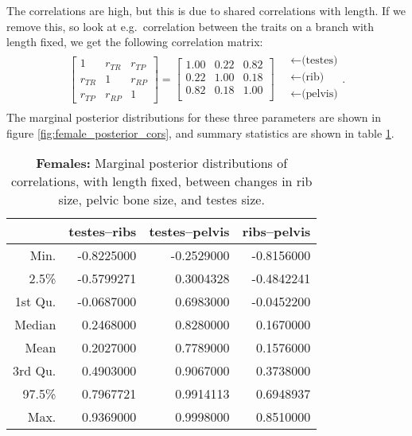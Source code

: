 \documentclass{article}
\begin{document}
The correlations are high, but this is due to shared correlations with length.
If we remove this, so look at e.g.\ correlation between the traits on a branch with length fixed,
we get the following correlation matrix:
\begin{align}
\begin{bmatrix}
  1 & r_{TR} & r_{TP} \\ 
  r_{TR} & 1 & r_{RP} \\ 
  r_{TP} & r_{RP} & 1 
 \end{bmatrix}
 =
\begin{bmatrix}
   1.00 & 0.22 & 0.82 \\ 
   0.22 & 1.00 & 0.18 \\ 
   0.82 & 0.18 & 1.00 \\ 
 \end{bmatrix}
\quad \begin{matrix}
  \leftarrow \text{(testes)} \\
  \leftarrow \text{(rib)} \\
  \leftarrow \text{(pelvis)} \\
\end{matrix}  .
\end{align}
The marginal posterior distributions for these three parameters
are shown in figure \ref{fig:female_posterior_cors},
and summary statistics are shown in table \ref{tab:female_posterior_cors}.

\begin{table}[ht]
\centering
\begin{tabular}{rrrr}
  \hline
        &  testes--ribs & testes--pelvis & ribs--pelvis \\
  \hline
 Min. &    -0.8225000  &  -0.2529000 & -0.8156000 \\
 2.5\% &   -0.5799271  &   0.3004328 & -0.4842241 \\
 1st Qu. & -0.0687000  &   0.6983000 & -0.0452200 \\
 Median &   0.2468000  &   0.8280000 &  0.1670000 \\
 Mean &     0.2027000  &   0.7789000 &  0.1576000 \\
 3rd Qu. &  0.4903000  &   0.9067000 &  0.3738000 \\
 97.5\%  &  0.7967721  &   0.9914113 &  0.6948937 \\
 Max. &     0.9369000  &   0.9998000 &  0.8510000 \\
   \hline
\end{tabular}
\caption{\textbf{Females:} Marginal posterior distributions of correlations, with length fixed,
  between changes in rib size, pelvic bone size, and testes size.
  \label{tab:female_posterior_cors}
}
\end{table}
\end{document}
